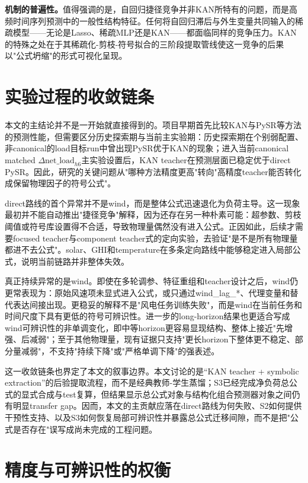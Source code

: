\textbf{机制的普遍性。}值得强调的是，自回归捷径竞争并非KAN所特有的问题，而是高频时间序列预测中的一般性结构特征。任何将自回归滞后与外生变量共同输入的稀疏模型——无论是Lasso、稀疏MLP还是KAN——都面临同样的竞争压力。KAN的特殊之处在于其稀疏化-剪枝-符号拟合的三阶段提取管线使这一竞争的后果以"公式坍缩"的形式可视化呈现。

\section{实验过程的收敛链条}

本文的主结论并不是一开始就直接得到的。项目早期首先比较KAN与PySR等方法的预测性能，但需要区分历史探索期与当前主实验期：历史探索期在个别弱配置、非canonical的load目标run中曾出现PySR优于KAN的现象；进入当前canonical matched $\Delta\text{net\_load}_{h6}$主实验设置后，KAN teacher在预测层面已稳定优于direct PySR。因此，研究的关键问题从"哪种方法精度更高"转向"高精度teacher能否转化成保留物理因子的符号公式"。

direct路线的首个异常并不是wind，而是整体公式迅速退化为负荷主导。这一现象最初并不能自动推出"捷径竞争"解释，因为还存在另一种朴素可能：超参数、剪枝阈值或符号库设置得不合适，导致物理量偶然没有进入公式。正因如此，后续才需要focused teacher与component teacher式的定向实验，去验证"是不是所有物理量都进不去公式"。solar、GHI和temperature在多条定向路线中能够稳定进入局部公式，说明当前链路并非整体失效。

真正持续异常的是wind。即使在多轮调参、特征重组和teacher设计之后，wind仍更常表现为：原始风速项未显式进入公式，或只通过wind\_lag\_*、代理变量和替代表达间接出现。更稳妥的解释不是"风电任务训练失败"，而是wind在当前任务和时间尺度下具有更低的符号可辨识性。进一步的long-horizon结果也更适合写成wind可辨识性的非单调变化，即中等horizon更容易显现结构、整体上接近"先增强、后减弱"；至于其他物理量，现有证据只支持"更长horizon下整体更不稳定、部分量减弱"，不支持"持续下降"或"严格单调下降"的强表述。

这一收敛链条也界定了本文的叙事边界。本文讨论的是``KAN teacher + symbolic extraction''的后验提取流程，而不是经典教师-学生蒸馏；S3已经完成净负荷总公式的显式合成与test复算，但结果显示总公式对象与结构化组合预测器对象之间仍有明显transfer gap。因而，本文的主贡献应落在direct路线为何失败、S2如何提供干预性支持、以及S3如何恢复局部可辨识性并暴露总公式迁移间隙，而不是把"公式是否存在"误写成尚未完成的工程问题。

\section{精度与可辨识性的权衡}

